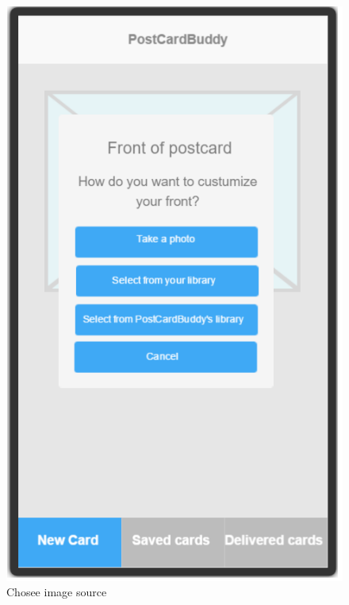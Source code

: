 \documentclass[10pt,a4paper]{article}
\begin{document}
\begin {description}
\begin{figure}
\begin{minipage}{0.35\textwidth}
		\includegraphics[width=\linewidth]{Prototype_img/p2.png}
		\caption{Chosee image source}
		\label{fig:p2}
	\end{minipage}
	\begin{minipage}{0.35\textwidth}

\end{minipage}
\end{figure}
\end{description}
\end{document}
